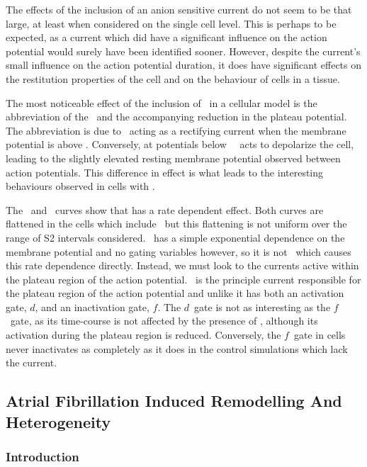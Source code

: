 The effects of the inclusion of an anion sensitive current do not seem to be
that large, at least when considered on the single cell level.  This is perhaps
to be expected, as a current which did have a significant influence on the
action potential would surely have been identified sooner.  However, despite the
current's small influence on the action potential duration, it does have
significant effects on the restitution properties of the cell and on the
behaviour of cells in a tissue.

The most noticeable effect of the inclusion of \ in a cellular model
is the abbreviation of the \apd[50]\ and the accompanying reduction in the
plateau potential.  The abbreviation is due to \ acting as a
rectifying current when the membrane potential is above .   Conversely,
at potentials below \ \ acts to depolarize the cell, leading
to the slightly elevated resting membrane potential observed between action
potentials.  This difference in effect is what leads to the interesting
behaviours observed in cells with .

The \apdr[50]\ and \apdr\ curves show that  has a rate dependent
effect.  Both curves are flattened in the cells which include \, but
this flattening is not uniform over the range of S2 intervals considered.
\ has a simple exponential dependence on the membrane potential and no
gating variables however, so it is not \ which causes this rate
dependence directly.  Instead, we must look to the currents active within the
plateau region of the action potential.  \ is the principle current
responsible for the plateau region of the action potential and unlike 
it has both an activation gate, $d$, and an inactivation gate, $f$.  The $d$\
gate is not as interesting as the $f$\ gate, as its time-course is not affected
by the presence of , although its activation during the plateau region
is reduced.  Conversely, the $f$\ gate in \ii{ANION} cells never inactivates as
completely as it does in the control simulations which lack the current.




\subsection{Atrial Fibrillation Induced Remodelling And Heterogeneity}

\subsubsection{Introduction}

